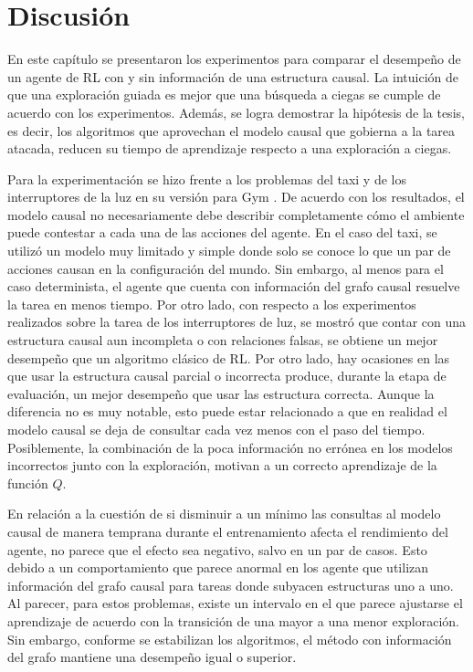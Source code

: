 \section{Discusión}

En este capítulo se presentaron los experimentos para comparar  el desempeño de un agente de RL con y sin información de una estructura causal. La intuición de que una exploración guiada es mejor que una búsqueda a ciegas se cumple de acuerdo 
con los experimentos. 
Además, se logra demostrar la hipótesis de la tesis, es decir, los algoritmos que aprovechan
el modelo causal que gobierna a la tarea atacada, reducen su tiempo de aprendizaje respecto a una exploración a ciegas.

Para la experimentación se hizo frente a los problemas del taxi \cite{Dietterich:2000:HRL:1622262.1622268} y de los interruptores de la luz \cite{nair2019causal} en su versión para Gym \cite{gym2016brockman}.
De acuerdo con los resultados, el modelo causal no necesariamente debe describir completamente cómo el ambiente puede contestar a cada una de las acciones del agente.
En el caso del taxi, se utilizó un modelo muy limitado y simple donde
solo se conoce lo que un par de acciones causan en la configuración del mundo. Sin embargo, al menos para el caso determinista,
el agente que cuenta con información del grafo causal resuelve la tarea en menos tiempo. Por otro lado, con respecto a los experimentos realizados sobre la tarea
de los interruptores de luz, se mostró que contar con una estructura causal aun incompleta o con relaciones falsas, se obtiene un mejor desempeño que un algoritmo 
clásico de RL. 
Por otro lado, hay ocasiones en las que usar la estructura causal parcial o incorrecta produce, durante la etapa de evaluación, un mejor desempeño que usar las estructura correcta. Aunque la diferencia no es muy notable, esto puede estar relacionado a que en realidad el modelo causal se deja de consultar cada vez menos con el paso del tiempo. Posiblemente, la combinación de la poca información no errónea en los modelos
incorrectos junto con la exploración, motivan a un correcto aprendizaje de la función $Q$.

En relación a la cuestión de si disminuir a un mínimo las consultas al modelo causal de manera temprana durante el entrenamiento afecta el rendimiento del agente, no 
parece que el efecto sea negativo, salvo en un par de casos. Esto debido a un comportamiento que parece anormal en los agente que utilizan información del grafo causal para tareas donde subyacen estructuras uno a uno. Al parecer, para estos problemas, existe un intervalo en el que parece 
ajustarse el aprendizaje de acuerdo con la transición de una mayor a una menor exploración. Sin embargo, conforme se estabilizan los algoritmos, el método con información del grafo mantiene una desempeño igual o superior.

